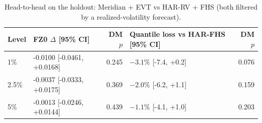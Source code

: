 \begin{table}[!htbp]
\centering
\small
\caption{Head-to-head on the holdout: Meridian + EVT vs HAR-RV + FHS (both filtered by a realized-volatility forecast).}
\label{tab:tailh2h}
\begin{tabularx}{\linewidth}{lXrXr}
\toprule
\textbf{Level} & \textbf{FZ0 $\Delta$ [95\% CI]} & \textbf{DM $p$} & \textbf{Quantile loss vs HAR-FHS [95\% CI]} & \textbf{DM $p$} \\
\midrule
1\% & -0.0100 [-0.0461, +0.0168] & 0.245 & $-3.1\%$ [-7.4, +0.2] & 0.076 \\
2.5\% & -0.0037 [-0.0333, +0.0175] & 0.369 & $-2.0\%$ [-6.2, +1.1] & 0.159 \\
5\% & -0.0013 [-0.0246, +0.0144] & 0.439 & $-1.1\%$ [-4.1, +1.0] & 0.203 \\
\bottomrule
\end{tabularx}
\end{table}
